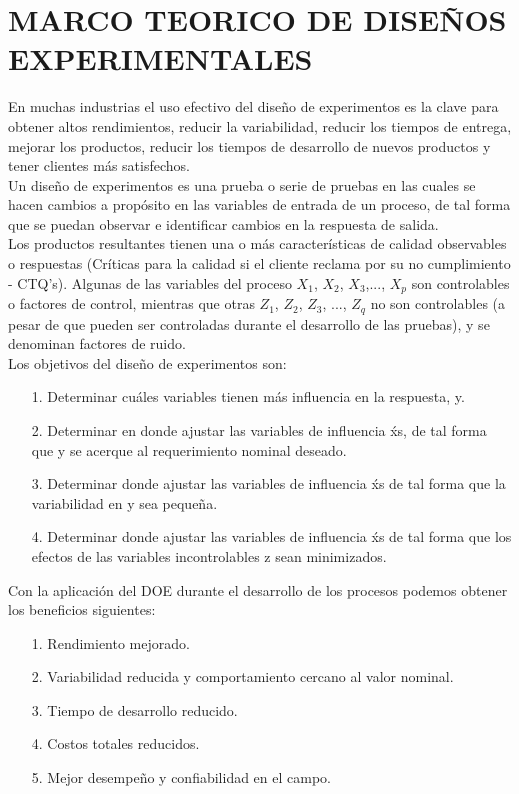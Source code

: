 \section{MARCO TEORICO DE DISE\~NOS EXPERIMENTALES}

En muchas industrias el uso efectivo del dise\~no de experimentos es la clave para obtener altos rendimientos, reducir la variabilidad, reducir los tiempos de entrega, mejorar los productos, reducir los tiempos de desarrollo de nuevos productos y tener clientes más satisfechos.\\

Un dise\~no de experimentos es una prueba o serie de pruebas en las cuales se hacen cambios a prop\'osito en las variables de entrada de un proceso, de tal forma que se puedan observar e identificar cambios en la respuesta de salida.\\
Los productos resultantes tienen una o m\'as caracter\'isticas de calidad observables o respuestas (Cr\'iticas para la calidad si el cliente reclama por su no cumplimiento - CTQ’s). Algunas de las variables del proceso $X_1$, $X_2$, $X_3$,..., $X_p$ son controlables o factores de control, mientras que otras $Z_1$, $Z_2$, $Z_3$, ..., $Z_q$ no son controlables (a pesar de que pueden ser controladas durante el desarrollo de las pruebas), y se denominan factores de ruido. \\

Los objetivos del dise\~no de experimentos son:

\begin{itemize}
 \item[1.] Determinar cu\'ales variables tienen m\'as influencia en la respuesta, y.
 \item[2.] Determinar en donde ajustar las variables de influencia \'xs, de tal forma que y se acerque al requerimiento nominal deseado.
 \item[3.] Determinar donde ajustar las variables de influencia \'xs de tal forma que la variabilidad en y sea peque\~na.
 \item[4.] Determinar donde ajustar las variables de influencia \'xs de tal forma que los efectos de las variables incontrolables z sean minimizados.
\end{itemize}

Con la aplicaci\'on del DOE durante el desarrollo de los procesos podemos obtener los beneficios siguientes:
\begin{itemize}
 \item[1.] Rendimiento mejorado.
 \item[2.] Variabilidad reducida y comportamiento cercano al valor nominal.
 \item[3.] Tiempo de desarrollo reducido.
 \item[4.] Costos totales reducidos.
 \item[5.] Mejor desempe\~no y confiabilidad en el campo.
\end{itemize}

